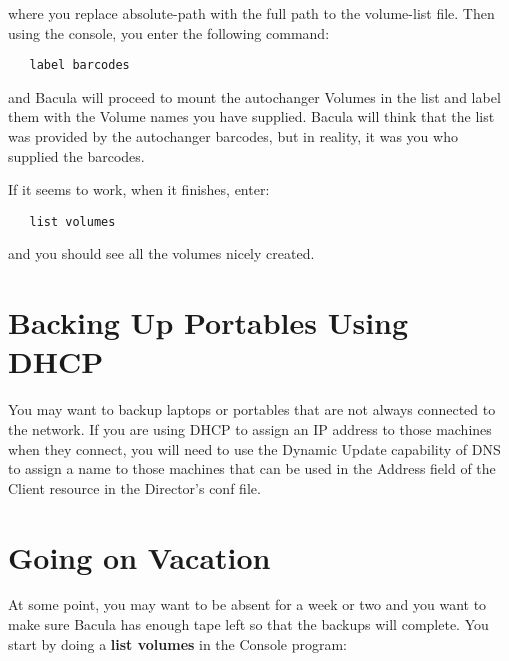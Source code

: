 where you replace \lt{}absolute-path\gt{} with the full path to the
volume-list file. Then using the console, you enter the following command: 

\footnotesize
\begin{verbatim}
   label barcodes
\end{verbatim}
\normalsize

and Bacula will proceed to mount the autochanger Volumes in the list and label
them with the Volume names you have supplied. Bacula will think that the list
was provided by the autochanger barcodes, but in reality, it was you who
supplied the \lt{}barcodes\gt{}. 

If it seems to work, when it finishes, enter: 

\footnotesize
\begin{verbatim}
   list volumes
\end{verbatim}
\normalsize

and you should see all the volumes nicely created. 

\section{Backing Up Portables Using DHCP}
\label{DNS}

You may want to backup laptops or portables that are not always connected to
the network. If you are using DHCP to assign an IP address to those machines
when they connect, you will need to use the Dynamic Update capability of DNS
to assign a name to those machines that can be used in the Address field of
the Client resource in the Director's conf file. 

\section{Going on Vacation}
\label{Vacation}

At some point, you may want to be absent for a week or two and you want to
make sure Bacula has enough tape left so that the backups will complete. You
start by doing a {\bf list volumes} in the Console program: 

